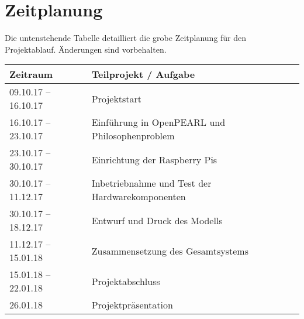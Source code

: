 	\section{Zeitplanung}
	Die untenstehende Tabelle detailliert die grobe Zeitplanung für den Projektablauf. Änderungen sind vorbehalten.\\
	
		\begin{tabular}{|p{5cm}|l|}
			\hline
			\textbf{Zeitraum} & \textbf{Teilprojekt / Aufgabe}\\
			\hline
			09.10.17 -- 16.10.17 & Projektstart\\
			\hline
			16.10.17 -- 23.10.17 & Einführung in OpenPEARL und Philosophenproblem\\
			\hline
			23.10.17 -- 30.10.17 & Einrichtung der Raspberry Pis\\
			\hline
			30.10.17 -- 11.12.17 & Inbetriebnahme und Test der Hardwarekomponenten\\
			\hline
			30.10.17 -- 18.12.17 & Entwurf und Druck des Modells\\
			\hline
			11.12.17 -- 15.01.18 & Zusammensetzung des Gesamtsystems\\
			\hline 
			15.01.18 -- 22.01.18 & Projektabschluss\\
			\hline
			26.01.18 & Projektpräsentation\\
			\hline
		\end{tabular}
	